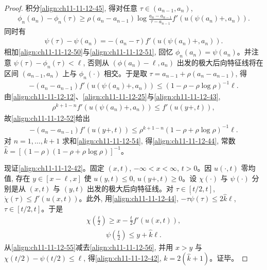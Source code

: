 \documentclass[../../main.tex]{subfiles}
\begin{document}
\begin{proof}
积分\eqref{align:ch11-11-12-45}, 得对任意 $\tau\in(a_{n-1},a_n)$,
\begin{align}
\phi_n(a_n)-\phi_n(\tau)\geqslant\rho(a_n-a_{n-1})\log\frac{a_n-a_{n-1}}{\tau-a_{n-1}}f'(u(\psi(a_n)+,a_n)).\label{align:ch11-11-12-50}
\end{align}
同时有
\begin{align}
\psi(\tau)-\psi(a_n)=-(a_n-\tau)f'(u(\psi(a_n)+,a_n)).\label{align:ch11-11-12-51}
\end{align}
相加\eqref{align:ch11-11-12-50}与\eqref{align:ch11-11-12-51}, 回忆 $\phi_n(a_n)=\psi(a_n)$。并注意 $\psi(\tau)-\phi_n(\tau)<\ell$, 否则从 $(\phi(a_n)-\ell,a_n)$ 出发的极大后向特征线将在区间 $(a_{n-1},a_n)$ 上与 $\phi_n(\cdot)$ 相交。于是取 $\tau=a_{n-1}+\rho(a_n-a_{n-1})$, 得
\begin{align}
-(a_n-a_{n-1})f'(u(\psi(a_n)+,a_n))\leqslant(1-\rho-\rho\log\rho)^{-1}\ell.\label{align:ch11-11-12-52}
\end{align}
由\eqref{align:ch11-11-12-12}、\eqref{align:ch11-11-12-25}与\eqref{align:ch11-11-12-43},
\begin{align}
\rho^{k+1-n}f'(u(\psi(a_n)+,a_n))\leqslant f'(u(y+,t)),\label{align:ch11-11-12-53}
\end{align}
故\eqref{align:ch11-11-12-52}给出
\begin{align}
-(a_n-a_{n-1})f'(u(y+,t))\leqslant\rho^{k+1-n}(1-\rho+\rho\log\rho)^{-1}\ell.\label{align:ch11-11-12-54}
\end{align}
对 $n=1,\ldots,k+1$ 求和\eqref{align:ch11-11-12-54}, 得\eqref{align:ch11-11-12-44}, 常数 $\hat{k}=[(1-\rho)(1-\rho+\rho\log\rho)]^{-1}$。

现证\eqref{align:ch11-11-12-42}。固定 $(x,t)$, $-\infty<x<\infty$, $t>0$。因 $u(\cdot,t)$ 零均值, 存在 $y\in[x-\ell,x]$ 使 $u(y,t)\leqslant0$, $u(y+,t)\geqslant0$。设 $\chi(\cdot)$ 与 $\psi(\cdot)$ 分别是从 $(x,t)$ 与 $(y,t)$ 出发的极大后向特征线。对 $\tau\in[t/2,t]$, $\dot{\chi}(\tau)\leqslant f'(u(x,t))$。此外, 用\eqref{align:ch11-11-12-44}, $-\tau\dot{\psi}(\tau)\leqslant2\hat{k}\ell$, $\tau\in[t/2,t]$。于是
\begin{align}
\chi\left(\frac{t}{2}\right)\geqslant x-\frac{t}{2}f'(u(x,t)),\label{align:ch11-11-12-55}
\end{align}
\begin{align}
\psi\left(\frac{t}{2}\right)\leqslant y+\hat{k}\ell.\label{align:ch11-11-12-56}
\end{align}
从\eqref{align:ch11-11-12-55}减去\eqref{align:ch11-11-12-56}, 并用 $x>y$ 与 $\chi(t/2)-\psi(t/2)\leqslant\ell$, 得\eqref{align:ch11-11-12-42}, $k=2(\hat{k}+1)$。证毕。
\end{proof}
\end{document}
